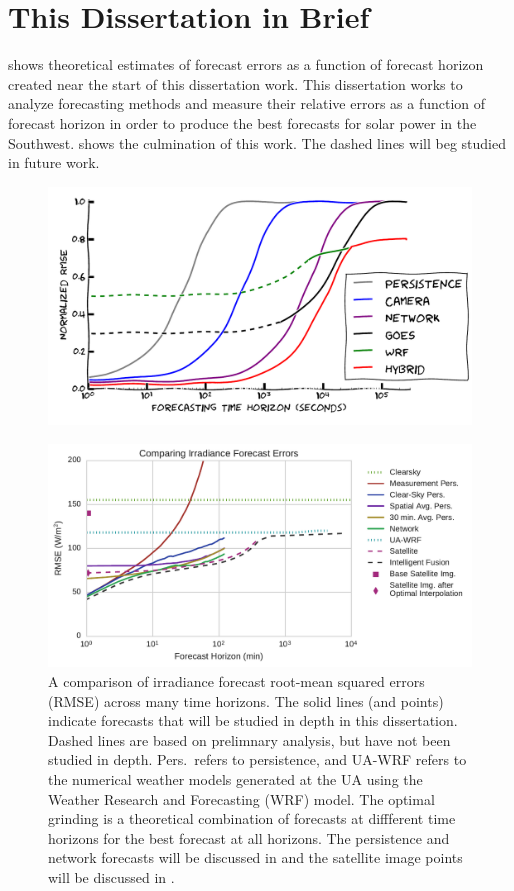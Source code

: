 \section{This Dissertation in Brief}

 shows theoretical estimates of
forecast errors as a function of forecast horizon created near the
start of this dissertation work.
This dissertation works to analyze forecasting methods and measure
their relative errors as a function of forecast horizon in order to
produce the best forecasts for solar power in the Southwest.
 shows the culmination of this work.
The dashed lines will beg studied in future work.

\begin{figure}[h]
\includegraphics[width=\textwidth]{figs/bullshit.pdf}
\end{figure}

\begin{figure}[h]
\includegraphics[width=\textwidth]{figs/timehorizon.pdf}
\caption[Irradiance forecast errors across forecast horizons]{A
  comparison of irradiance forecast root-mean squared errors (RMSE)
  across many time horizons. The solid lines (and points) indicate
  forecasts that will be studied in depth in this dissertation. Dashed
  lines are based on prelimnary analysis, but have not been studied in
  depth. Pers.\ refers to persistence, and UA-WRF refers to the
  numerical weather models generated at the UA using the Weather
  Research and Forecasting (WRF) model. The optimal grinding is a
  theoretical combination of forecasts at diffferent time horizons for
  the best forecast at all horizons. The persistence and network
  forecasts will be discussed in  and the satellite
  image points will be discussed in .}
\label{fig:newshitplot}
\end{figure}

